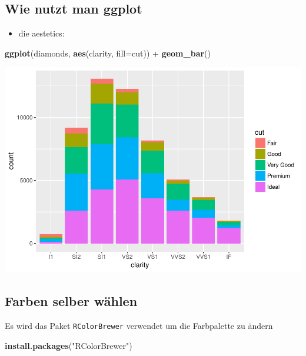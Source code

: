 \documentclass[]{article}
\newenvironment{Shaded}{\begin{snugshade}}{\end{snugshade}}
\newcommand{\KeywordTok}[1]{\textcolor[rgb]{0.13,0.29,0.53}{\textbf{{#1}}}}
\newcommand{\DataTypeTok}[1]{\textcolor[rgb]{0.13,0.29,0.53}{{#1}}}
\newcommand{\StringTok}[1]{\textcolor[rgb]{0.31,0.60,0.02}{{#1}}}
\newcommand{\NormalTok}[1]{{#1}}
\providecommand{\tightlist}{%
  \setlength{\itemsep}{0pt}\setlength{\parskip}{0pt}}
\begin{document}
\subsection{Wie nutzt man ggplot}\label{wie-nutzt-man-ggplot}

\begin{itemize}
\tightlist
\item
  die aestetics:
\end{itemize}

\begin{Shaded}
\begin{Highlighting}[]
\KeywordTok{ggplot}\NormalTok{(diamonds, }\KeywordTok{aes}\NormalTok{(clarity, }\DataTypeTok{fill=}\NormalTok{cut)) +}\StringTok{ }\KeywordTok{geom_bar}\NormalTok{()}
\end{Highlighting}
\end{Shaded}

\includegraphics{Intro_Datenanalyse1_files/figure-latex/unnamed-chunk-228-1.pdf}

\subsection{Farben selber wählen}\label{farben-selber-wahlen}

Es wird das Paket \texttt{RColorBrewer} verwendet um die Farbpalette zu
ändern

\begin{Shaded}
\begin{Highlighting}[]
\KeywordTok{install.packages}\NormalTok{(}\StringTok{"RColorBrewer"}\NormalTok{)}
\end{Highlighting}
\end{Shaded}
\end{document}
